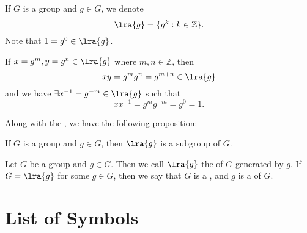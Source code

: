 \documentclass[notoc,notitlepage]{tufte-book}
\begin{document}
\begin{notation}
  If $G$ is a group and $g \in G$, we denote
  \begin{equation*}
    \lra{g} = \{ g^k : k \in \mathbb{Z} \}.
  \end{equation*}
  Note that $1 = g^0 \in \lra{g}$.

  If $x = g^m, y = g^n \in \lra{g}$ where $m, n \in \mathbb{Z}$, then
  \begin{equation*}
    xy = g^m g^n = g^{m + n} \in \lra{g}
  \end{equation*}
  and we have $\exists x^{-1} = g^{-m} \in \lra{g}$ such that
  \begin{equation*}
    xx^{-1} = g^m g^{-m} = g^0 = 1.
  \end{equation*}
\end{notation}

Along with the , we have the following proposition:

\begin{propo}\label{propo:cyclic_groups_as_a_subgroup}
  If $G$ is a group and $g \in G$, then $\lra{g}$ is a subgroup of $G$.
\end{propo}

\begin{defn}\label{defn:cyclic_groups}
  Let $G$ be a group and $g \in G$. Then we call $\lra{g}$ the  of $G$ generated by $g$. If $G = \lra{g}$ for some $g \in G$, then we say that $G$ is a , and $g$ is a  of $G$.
\end{defn}




\nobibliography*


\printindex

\chapter*{List of Symbols}
\end{document}
